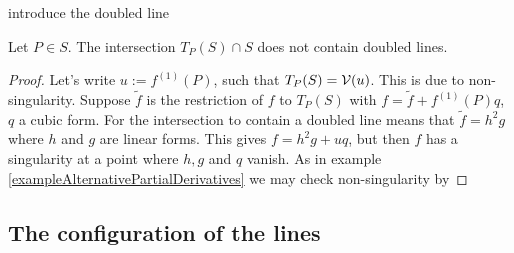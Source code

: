 \begin{lemma}
\begin{todo}\item introduce the doubled line \end{todo}
Let $P \in S$. The intersection $T_P(S) \cap S$ does not contain doubled lines.
\end{lemma}
\begin{proof}
Let's write $u := f^{(1)}(P)$, such that $T_P(S) = \operatorname{\mathcal V}(u)$.
This is due to non-singularity. Suppose $\widetilde f$ is the restriction of $f$ to $T_P(S)$ with $f = \widetilde f + f^{(1)}(P)q$, $q$ a cubic form.
For the intersection to contain a doubled line means that $\widetilde f = h^2g$ where $h$ and $g$ are linear forms.
This gives $f = h^2g + uq$, but then $f$ has a singularity at a point where $h,g$ and $q$ vanish.
As in example \ref{exampleAlternativePartialDerivatives} we may check non-singularity by 
\end{proof}




\subsection{The configuration of the lines}
